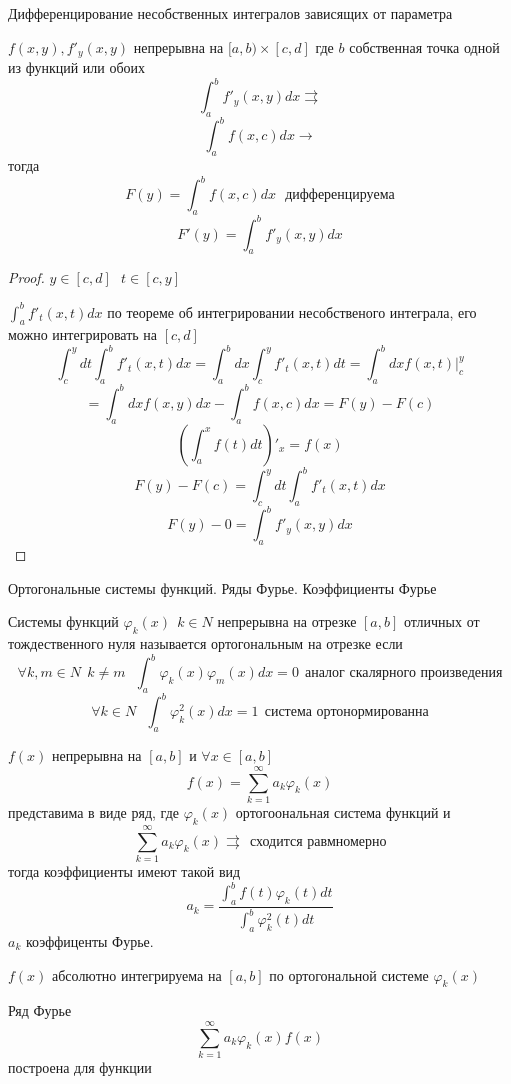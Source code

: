\begin{title}[\Large]
  Дифференцирование несобственных интегралов зависящих от параметра
\end{title}

\begin{theorem}
  $f(x,y), f'_y (x,y)$ непрерывна на $[a,b) \times [c,d]$ где $b$ собственная
  точка одной из функций или обоих
  $$
  \int_a^b f'_y (x,y) dx \rightrightarrows
  $$
  $$
  \int_a^b f(x,c) dx \rightarrow
  $$
  тогда
  $$
  F(y) = \int_a^b f (x,c) dx ~~~ \text{дифференцируема}
  $$
  $$
  F'(y) = \int_a^b f'_y (x,y) dx
  $$
\end{theorem}

\begin{proof}
  $y \in [c,d] ~~~ t \in [c,y]$

  $\int_a^b f'_t(x,t)dx$ по теореме об интегрировании несобственого интеграла,
  его можно интегрировать на $[c,d]$
  $$
  \int_c^y dt \int_a^b f'_t(x, t) dx
  =
  \int_a^b dx \int_c^y f'_t(x,t) dt
  =
  \int_a^b dx f(x,t)|_c^y
  $$
  $$
  =
  \int_a^b dx f(x,y) dx - \int_a^b f(x,c)dx = F(y) - F(c)
  $$
  $$
  \left( \int_a^x f(t) dt \right)'_x = f(x)
  $$
  $$
  F(y) - F(c) = \int_c^y dt \int_a^b f'_t(x,t) dx
  $$
  $$
  F(y) - 0 = \int_a^b f'_y(x,y) dx
  $$
\end{proof}

\begin{title}[\Large]
  Ортогональные системы функций. Ряды Фурье. Коэффициенты Фурье
\end{title}

\begin{define}
  Системы функций $\varphi_k(x) ~~ k \in N$ непрерывна на отрезке $[a,b]$
  отличных от тождественного нуля называется ортогональным на отрезке
  если
  $$
  \forall k,m \in N ~~ k \not= m
  ~~~
  \int_a^b \varphi_k(x)\varphi_m(x) dx = 0
  ~~
  \text{аналог скалярного произведения}
  $$
  $$
  \forall k \in N
  ~~~
  \int_a^b \varphi_k^2(x) dx = 1
  ~~
  \text{система ортонормированна}
  $$
\end{define}

\begin{theorem}
  $f(x)$ непрерывна на $[a,b]$ и $\forall x \in [a,b]$
  $$
  f(x) = \sum_{k=1}^{\infty} a_k \varphi_k(x)
  $$
  представима в виде ряд, где $\varphi_k(x)$ ортогоональная система функций и
  $$
  \sum_{k=1}^{\infty} a_k \varphi_k(x) \rightrightarrows
  ~~
  \text{сходится равмномерно}
  $$
  тогда коэффициенты имеют такой вид
  $$
  a_k = \frac{
    \int_a^b f(t) \varphi_k(t) dt
  }{
    \int_a^b \varphi_k^2(t) dt
  }
  $$
  $a_k$ коэффиценты Фурье.

  $f(x)$ абсолютно интегрируема на $[a,b]$ по ортогональной системе
  $\varphi_k(x)$

  Ряд Фурье
  $$
  \sum_{k=1}^{\infty} a_k \varphi_k(x) f(x)
  $$
  построена для функции
\end{theorem}

